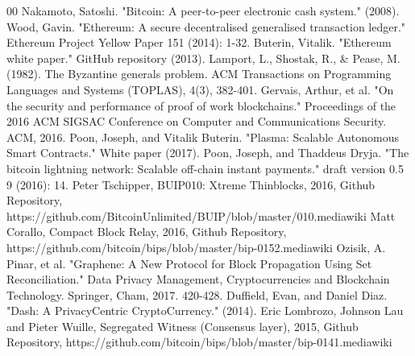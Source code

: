 \documentclass[journal,12pt,onecolumn,draftclsnofoot,]{IEEEtran}
\begin{document}
\begin{thebibliography}{00}
     Nakamoto, Satoshi. "Bitcoin: A peer-to-peer electronic cash
        system." (2008).
     Wood, Gavin. "Ethereum: A secure decentralised generalised
        transaction ledger." Ethereum Project Yellow Paper 151 (2014): 1-32.
     Buterin, Vitalik. "Ethereum white paper." GitHub repository
        (2013).
     Lamport, L., Shostak, R., & Pease, M. (1982). The Byzantine
        generals problem. ACM Transactions on Programming Languages and Systems
        (TOPLAS), 4(3), 382-401.
     Gervais, Arthur, et al. "On the security and performance
        of proof of work blockchains." Proceedings of the 2016 ACM SIGSAC
        Conference on Computer and Communications Security. ACM, 2016.
     Poon, Joseph, and Vitalik Buterin. "Plasma: Scalable
        Autonomous Smart Contracts." White paper (2017).
     Poon, Joseph, and Thaddeus Dryja. "The bitcoin lightning
        network: Scalable off-chain instant payments." draft version 0.5 9
        (2016): 14.
     Peter Tschipper, BUIP010: Xtreme Thinblocks, 2016, Github
        Repository, https://github.com/BitcoinUnlimited/BUIP/blob/master/010.mediawiki  
     Matt Corallo, Compact Block Relay, 2016, Github
        Repository, https://github.com/bitcoin/bips/blob/master/bip-0152.mediawiki  
     Ozisik, A. Pinar, et al. "Graphene: A New Protocol for
        Block Propagation Using Set Reconciliation." Data Privacy Management,
        Cryptocurrencies and Blockchain Technology. Springer, Cham, 2017.
        420-428.
     Duffield, Evan, and Daniel Diaz. "Dash: A PrivacyCentric
        CryptoCurrency." (2014).
     Eric Lombrozo, Johnson Lau and Pieter Wuille, Segregated
        Witness (Consensus layer), 2015, Github Repository, https://github.com/bitcoin/bips/blob/master/bip-0141.mediawiki 
\end{thebibliography}
\end{document}
